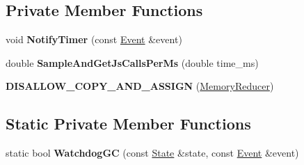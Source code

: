 \subsection*{Private Member Functions}
\begin{DoxyCompactItemize}
\item 
void {\bfseries Notify\+Timer} (const \hyperlink{structv8_1_1internal_1_1_memory_reducer_1_1_event}{Event} \&event)\hypertarget{classv8_1_1internal_1_1_memory_reducer_a6113a2856a04756b860ac3092424570c}{}\label{classv8_1_1internal_1_1_memory_reducer_a6113a2856a04756b860ac3092424570c}

\item 
double {\bfseries Sample\+And\+Get\+Js\+Calls\+Per\+Ms} (double time\+\_\+ms)\hypertarget{classv8_1_1internal_1_1_memory_reducer_a834593c90c2d90d179f248de896c2f1a}{}\label{classv8_1_1internal_1_1_memory_reducer_a834593c90c2d90d179f248de896c2f1a}

\item 
{\bfseries D\+I\+S\+A\+L\+L\+O\+W\+\_\+\+C\+O\+P\+Y\+\_\+\+A\+N\+D\+\_\+\+A\+S\+S\+I\+GN} (\hyperlink{classv8_1_1internal_1_1_memory_reducer}{Memory\+Reducer})\hypertarget{classv8_1_1internal_1_1_memory_reducer_ac6e5a1165b1551dcfacc9a066c041760}{}\label{classv8_1_1internal_1_1_memory_reducer_ac6e5a1165b1551dcfacc9a066c041760}

\end{DoxyCompactItemize}
\subsection*{Static Private Member Functions}
\begin{DoxyCompactItemize}
\item 
static bool {\bfseries Watchdog\+GC} (const \hyperlink{structv8_1_1internal_1_1_memory_reducer_1_1_state}{State} \&state, const \hyperlink{structv8_1_1internal_1_1_memory_reducer_1_1_event}{Event} \&event)\hypertarget{classv8_1_1internal_1_1_memory_reducer_a4ef347b802a3ef3f47628aed3e89f2ee}{}\label{classv8_1_1internal_1_1_memory_reducer_a4ef347b802a3ef3f47628aed3e89f2ee}

\end{DoxyCompactItemize}
